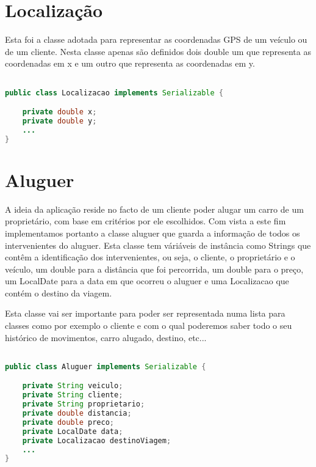 \documentclass[a4paper,11pt]{report}
\begin{document}
\section{Localização}

\hspace{0.50cm} Esta foi a classe adotada para representar as coordenadas GPS de um veículo ou de um cliente. Nesta classe apenas são definidos dois double um que representa as coordenadas em x e um outro que representa as coordenadas em y.

\begin{lstlisting}[language=java]

public class Localizacao implements Serializable {

    private double x;
    private double y;
    ...
}    
\end{lstlisting}

\section{Aluguer}

\hspace{0.50cm} A ideia da aplicação reside no facto de um cliente poder alugar um carro de um proprietário, com base em critérios por ele escolhidos. Com vista a este fim implementamos portanto a classe aluguer que guarda a informação de todos os intervenientes do aluguer. Esta classe tem váriáveis de instância como Strings que contêm a identificação dos intervenientes, ou seja, o cliente, o proprietário e o veículo, um double para a distância que foi percorrida, um double para o preço, um LocalDate para a data em que ocorreu o aluguer e uma Localizacao que contém o destino da viagem.

\vspace{0.5cm}

Esta classe vai ser importante para poder ser representada numa lista para classes como por exemplo o cliente
e com o qual poderemos saber todo o seu histórico de movimentos, carro alugado, destino, etc...

\begin{lstlisting}[language=java]

public class Aluguer implements Serializable {

    private String veiculo;
    private String cliente;
    private String proprietario;
    private double distancia;
    private double preco;
    private LocalDate data;
    private Localizacao destinoViagem;
    ...
}
\end{lstlisting}
\end{document}
